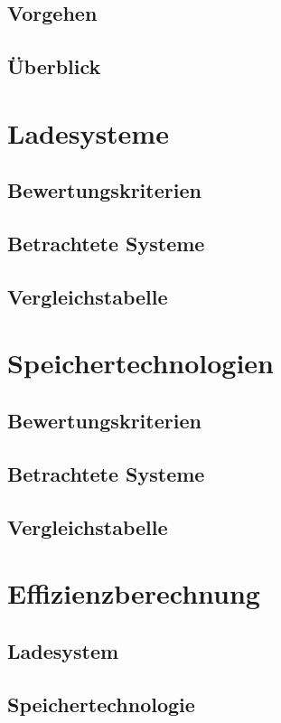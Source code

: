 \documentclass[twoside]{scrreprt}
\begin{document}
\section{Vorgehen}
\section{Überblick} %

\chapter{Ladesysteme}
\section{Bewertungskriterien} %
\section{Betrachtete Systeme} %
\section{Vergleichstabelle}   %

\chapter{Speichertechnologien}
\section{Bewertungskriterien} %
\section{Betrachtete Systeme} %
\section{Vergleichstabelle}   %

\chapter{Effizienzberechnung} %
\section{Ladesystem}
\section{Speichertechnologie}
\end{document}
